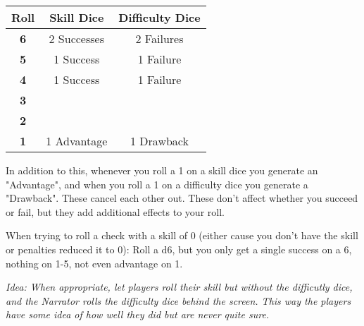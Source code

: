 \begin{center}
    \noindent\begin{tabular}{@{}c c c@{}}
        \textbf{Roll} & \textbf{Skill Dice} & \textbf{Difficulty Dice}\\
        \toprule
        \textbf{6} & 2 Successes & 2 Failures\\
        \textbf{5} & 1 Success & 1 Failure\\
        \textbf{4} & 1 Success & 1 Failure\\
        \textbf{3} & & \\
        \textbf{2} & & \\
        \textbf{1} & 1 Advantage & 1 Drawback\\
        \bottomrule
    \end{tabular}
\end{center}

In addition to this, whenever you roll a 1 on a skill dice you generate an "Advantage", and when you roll a 1 on a difficulty dice you generate a "Drawback". These cancel each other out. These don't affect whether you succeed or fail, but they add additional effects to your roll.

When trying to roll a check with a skill of 0 (either cause you don't have the skill or penalties reduced it to 0):  
Roll a d6, but you only get a single success on a 6, nothing on 1-5, not even advantage on 1.

\textit{Idea: When appropriate, let players roll their skill but without the difficutly dice, and the Narrator rolls the difficulty dice behind the screen. This way the players have some idea of how well they did but are never quite sure.
}

